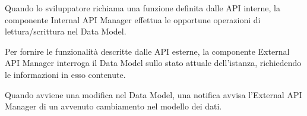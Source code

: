 
			Quando lo sviluppatore richiama una funzione definita dalle API interne, la componente Internal API Manager effettua le opportune operazioni di lettura/scrittura nel Data Model.

			Per fornire le funzionalità descritte dalle API esterne, la componente External API Manager interroga il Data Model sullo stato attuale dell'istanza, richiedendo le informazioni in esso contenute.

			Quando avviene una modifica nel Data Model, una notifica avvisa l'External API Manager di un avvenuto cambiamento nel modello dei dati.
